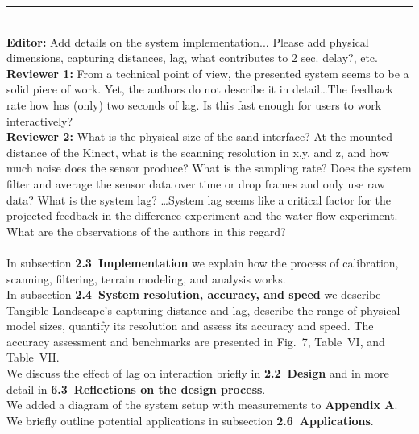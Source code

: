 \documentclass[prodmode,acmtochi]{acmsmall} %
\newcommand{\doublerule}[1][.4pt]{%
  \noindent
  \makebox[0pt][l]{\rule[.7ex]{\linewidth}{#1}}%
  \rule[.3ex]{\linewidth}{#1}}
\begin{document}
\doublerule\\

\textbf{Editor:} Add details on the system implementation... Please add physical dimensions, capturing distances, lag, what contributes to 2 sec. delay?, etc. \\

\textbf{Reviewer 1:} From a technical point of view, the presented system seems to be a solid piece of work. Yet, the authors do not describe it in detail\ldots The feedback rate how has (only) two seconds of lag. Is this fast enough for users to work interactively?\\

\textbf{Reviewer 2:} What is the physical size of the sand interface?
At the mounted distance of the Kinect, what is the scanning resolution in x,y, and z, and how much noise does the sensor produce? What is the sampling rate? Does the system filter and average the sensor data over time or drop frames and only use raw data?
What is the system lag? \ldots System lag seems like a critical factor for the projected feedback in the difference experiment and the water flow experiment. What are the observations of the authors in this regard?\\

\hrulefill \\

In subsection \textbf{2.3~Implementation} 
we explain how the process of calibration, scanning, filtering,
terrain modeling, and analysis works.\\

In subsection \textbf{2.4~System resolution, accuracy, and speed} 
we describe Tangible Landscape's capturing distance and lag,
describe the range of physical model sizes,
quantify its resolution and
assess its accuracy and speed.
The accuracy assessment and benchmarks are presented 
in Fig.~7, Table~VI, and Table~VII. \\

We discuss the effect of lag on interaction 
briefly in \textbf{2.2~Design} and in more detail in
\textbf{6.3~Reflections on the design process}.\\

We added a diagram of the system setup with measurements to 
\textbf{Appendix A}. \\

We briefly outline potential applications in 
subsection  \textbf{2.6~Applications}. \\
\end{document}
